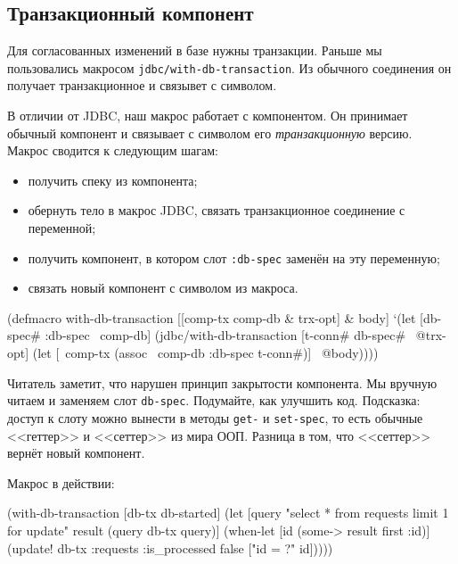 \subsection{Транзакционный компонент}


Для согласованных изменений в базе нужны транзакции. Раньше мы пользовались
макросом \verb|jdbc/with-db-transaction|. Из обычного соединения он получает
транзакционное и связывет с символом.

В отличии от JDBC, наш макрос работает с компонентом. Он принимает обычный
компонент и связывает с символом его \emph{транзакционную} версию. Макрос
сводится к следующим шагам:

\begin{itemize}

\item
  получить спеку из компонента;

\item
  обернуть тело в макрос JDBC, связать транзакционное соединение с переменной;

\item
  получить компонент, в котором слот \verb|:db-spec| заменён на эту переменную;

\item
  связать новый компонент с символом из макроса.

\end{itemize}

\begin{english}
  \begin{clojure}
(defmacro with-db-transaction
  [[comp-tx comp-db & trx-opt] & body]
  `(let [{db-spec# :db-spec} ~comp-db]
     (jdbc/with-db-transaction
       [t-conn# db-spec# ~@trx-opt]
       (let [~comp-tx (assoc ~comp-db :db-spec t-conn#)]
         ~@body))))
  \end{clojure}
\end{english}


Читатель заметит, что нарушен принцип закрытости компонента. Мы вручную читаем и
заменяем слот \verb|db-spec|. Подумайте, как улучшить код. Подсказка: доступ к
слоту можно вынести в методы \verb|get-| и \verb|set-spec|, то есть обычные
<<геттер>> и <<сеттер>> из мира ООП. Разница в том, что <<сеттер>> вернёт новый
компонент.

Макрос в действии:

\begin{english}
  \begin{clojure}
(with-db-transaction
  [db-tx db-started]
  (let [query "select * from requests limit 1 for update"
        result (query db-tx query)]
    (when-let [id (some-> result first :id)]
      (update! db-tx :requests
               {:is_processed false}
               ["id = ?" id]))))
  \end{clojure}
\end{english}

